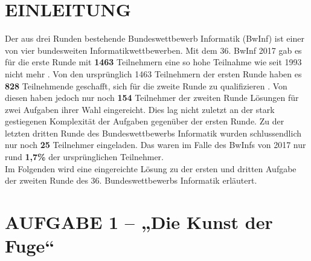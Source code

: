 \documentclass[a4paper,12pt]{article}
\begin{document}

\newpage

\thispagestyle{empty}
\tableofcontents	
\thispagestyle{empty}




\newpage
\setcounter{page}{4}
\section{EINLEITUNG}



Der aus drei Runden bestehende Bundeswettbewerb Informatik (BwInf) ist einer von vier bundesweiten Informatikwettbewerben. Mit dem 36. BwInf 2017 gab es für die erste Runde mit \textbf{1463} Teilnehmern eine so hohe Teilnahme wie seit 1993 nicht mehr \cite{bwinf_runde1_ergebnis}. Von den ursprünglich 1463 Teilnehmern der ersten Runde haben es \textbf{828} Teilnehmende geschafft, sich für die zweite Runde zu qualifizieren \cite{bwinf_runde2_ergebnis}. Von diesen haben jedoch nur noch \textbf{154} Teilnehmer der zweiten Runde Lösungen für zwei Aufgaben ihrer Wahl eingereicht. Dies lag nicht zuletzt an der stark gestiegenen Komplexität der Aufgaben gegenüber der ersten Runde. Zu der letzten dritten Runde des Bundeswettbewerbs Informatik wurden schlussendlich nur noch \textbf{25} Teilnehmer eingeladen. Das waren im Falle des BwInfs von 2017 nur rund \textbf{1,7\%} der ursprünglichen Teilnehmer.
\\[0.4cm]
Im Folgenden wird eine eingereichte Lösung zu der ersten und dritten Aufgabe der zweiten Runde des 36. Bundeswettbewerbs Informatik erläutert.


\newpage
\section{AUFGABE 1 – „Die Kunst der Fuge“}
\end{document}
